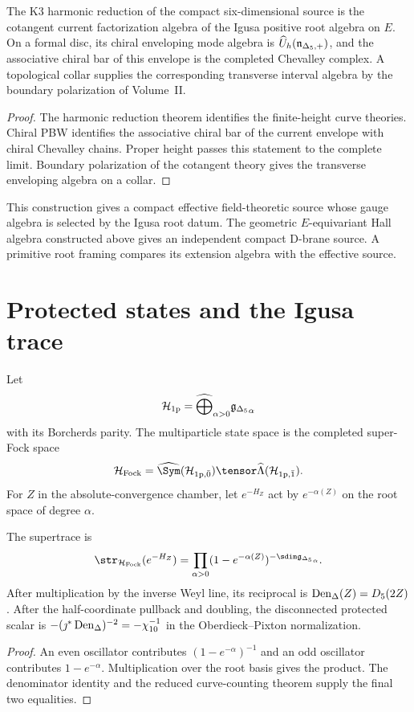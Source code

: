 \begin{corollary}
The K3 harmonic reduction of the compact six-dimensional source is the cotangent current factorization algebra of the Igusa positive root algebra on $E$.  On a formal disc, its chiral enveloping mode algebra is $\widehat U_h({\mathfrak n_{\Delta_5,+}})$, and the associative chiral bar of this envelope is the completed Chevalley complex.  A topological collar supplies the corresponding transverse interval algebra by the boundary polarization of Volume~II.
\end{corollary}
\begin{proof}
The harmonic reduction theorem identifies the finite-height curve theories.  Chiral PBW identifies the associative chiral bar of the current envelope with chiral Chevalley chains.  Proper height passes this statement to the complete limit.  Boundary polarization of the cotangent theory gives the transverse enveloping algebra on a collar.
\end{proof}

This construction gives a compact effective field-theoretic source whose gauge algebra is selected by the Igusa root datum.  The geometric $E$-equivariant Hall algebra constructed above gives an independent compact D-brane source.  A primitive root framing compares its extension algebra with the effective source.

\chapter{Protected states and the Igusa trace}
Let
\[
 \mathcal H_{\mathrm{1p}}
 =\widehat\bigoplus_{\alpha>0}{\mathfrak g_{\Delta_5}}_\alpha
\]
with its Borcherds parity.  The multiparticle state space is the completed super-Fock space
\[
 \mathcal H_{\mathrm{Fock}}=\widehat\Sym(\mathcal H_{\mathrm{1p},\bar0})
 \tensor\widehat\Lambda(\mathcal H_{\mathrm{1p},\bar1}).
\]
For $Z$ in the absolute-convergence chamber, let $e^{-H_Z}$ act by $e^{-\alpha(Z)}$ on the root space of degree $\alpha$.

\begin{theorem}
The supertrace is
\[
 \str_{\mathcal H_{\mathrm{Fock}}}(e^{-H_Z})
 =\prod_{\alpha>0}
 (1-e^{-\alpha(Z)})^{-\sdim\gIg_\alpha}.
\]
After multiplication by the inverse Weyl line, its reciprocal is $\operatorname{Den}_{\Delta}(Z)=D_5(2Z)$.  After the half-coordinate pullback and doubling, the disconnected protected scalar is $-(\jmath^*\operatorname{Den}_{\Delta})^{-2}=-\chi_{10}^{-1}$ in the Oberdieck--Pixton normalization.
\end{theorem}
\begin{proof}
An even oscillator contributes $(1-e^{-\alpha})^{-1}$ and an odd oscillator contributes $1-e^{-\alpha}$.  Multiplication over the root basis gives the product.  The denominator identity and the reduced curve-counting theorem supply the final two equalities.
\end{proof}

